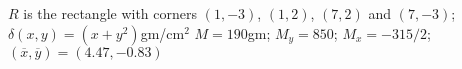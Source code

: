 {$R$ is the rectangle with corners $(1,-3)$, $(1,2)$, $(7,2)$ and $(7,-3)$; $\delta(x,y) = (x+y^2)$gm/cm$^2$
}
{$M = 190$gm; $M_y= 850$; $M_x = -315/2$; $(\overline{x},\overline{y}) = (4.47,-0.83)$
}